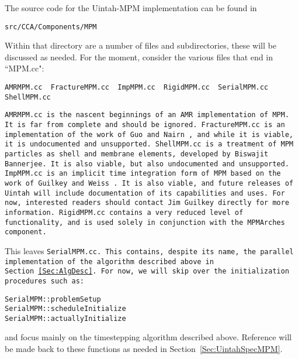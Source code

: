 The source code for the Uintah-MPM implementation can be found in

\begin{Verbatim}[fontsize=\footnotesize]
src/CCA/Components/MPM
\end{Verbatim}
Within that directory are a number of files and subdirectories, these will be
discussed as needed.  For the moment, consider the various files that end in
``{MPM.cc}":
\begin{Verbatim}[fontsize=\footnotesize]
AMRMPM.cc  FractureMPM.cc  ImpMPM.cc  RigidMPM.cc  SerialMPM.cc  ShellMPM.cc
\end{Verbatim}

\tt AMRMPM.cc \normalfont is the nascent beginnings of an AMR implementation of MPM. 
It is far from complete and should be ignored.  \tt FractureMPM.cc \normalfont is an implementation of
the work of Guo and Nairn \cite{GuoNairn}, and while it is viable, it is
undocumented and unsupported.  \tt ShellMPM.cc \normalfont is a treatment of MPM particles
as shell and membrane elements, developed by Biswajit Bannerjee.  It is also
viable, but also undocumented and unsupported.  \tt ImpMPM.cc \normalfont is an implicit
time integration form of MPM based on the work of Guilkey and Weiss
\cite{Guilkey03}.  It is also viable, and future releases of Uintah will include
documentation of its capabilities and uses.  For now, interested readers
should contact Jim Guilkey directly for more information.  \tt RigidMPM.cc \normalfont contains
a very reduced level of functionality, and is used solely in conjunction with
the MPMArches component.

This leaves \tt SerialMPM.cc. \normalfont  This contains, despite its name, the parallel
implementation of the algorithm described above in Section~\ref{Sec:AlgDesc}.
For now, we will skip over the initialization procedures such as:
\begin{Verbatim}[fontsize=\footnotesize]
SerialMPM::problemSetup
SerialMPM::scheduleInitialize
SerialMPM::actuallyInitialize
\end{Verbatim}
and focus mainly on the timestepping algorithm described above.  Reference
will be made back to these functions as needed in
Section~\ref{Sec:UintahSpecMPM}.

